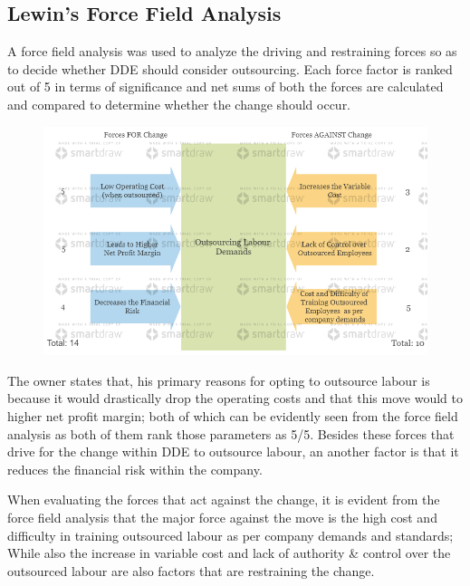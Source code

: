 
\subsection{Lewin's Force Field Analysis}

	{A force field analysis was used to analyze the driving and restraining forces so as to decide whether DDE should consider outsourcing. Each force factor is ranked out of 5 in terms of significance and net sums of both the forces are calculated and compared to determine whether the change should occur.}
	
	\begin{figure}[H]
    	\centering
    	\includegraphics[width=15cm]{Lewin's Force Analysis.png}
    	\label{}
	\end{figure}
	
	{The owner states that, his primary reasons for opting to outsource labour is because it would drastically drop the operating costs and that this move would to higher net profit margin; both of which can be evidently seen from the force field analysis as both of them rank those parameters as 5/5. Besides these forces that drive for the change within DDE to outsource labour, an another factor is that it reduces the financial risk within the company.}	
	
	{When evaluating the forces that act against the change, it is evident from the force field analysis that the major force against the move is the high cost and difficulty in training outsourced labour as per company demands and standards; While also the increase in variable cost and lack of authority \& control over the outsourced labour are also factors that are restraining the change.}
	
